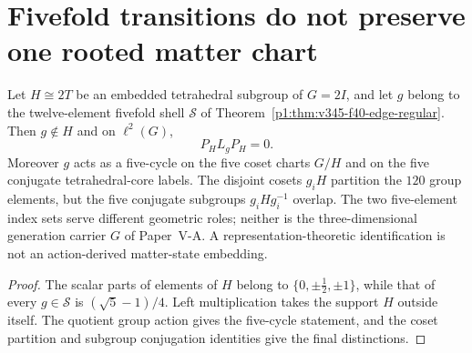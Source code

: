 \documentclass[12pt,a4paper]{article}
\begin{document}


\clearpage
\section{Fivefold transitions do not preserve one rooted matter chart}
\label{p5:sec:v345-core-transition-boundary}
\begin{proposition}
\label{p5:prop:v345-core-fivefold-transport}
Let $H\cong2T$ be an embedded tetrahedral subgroup of
$G=2I$, and let $g$ belong to the twelve-element fivefold shell
$\mathcal S$ of Theorem~\ref{p1:thm:v345-f40-edge-regular}.
Then $g\notin H$ and on $\ell^2(G)$,
\[
 \boxed{P_HL_gP_H=0.}
\]
Moreover $g$ acts as a five-cycle on the five coset charts
$G/H$ and on the five conjugate tetrahedral-core labels.
The disjoint cosets $g_iH$ partition the $120$ group elements,
but the five conjugate subgroups $g_iHg_i^{-1}$ overlap.
The two five-element index sets serve different geometric roles;
neither is the three-dimensional generation carrier $G$ of
Paper~V-A.  A representation-theoretic identification is not
an action-derived matter-state embedding.
\end{proposition}
\begin{proof}
The scalar parts of elements of $H$ belong to
$\{0,\pm\tfrac12,\pm1\}$, while that of every $g\in\mathcal S$
is $(\sqrt5-1)/4$.  Left multiplication takes the support $H$
outside itself.  The quotient group action gives the five-cycle
statement, and the coset partition and subgroup conjugation
identities give the final distinctions.
\end{proof}


\clearpage
\end{document}
